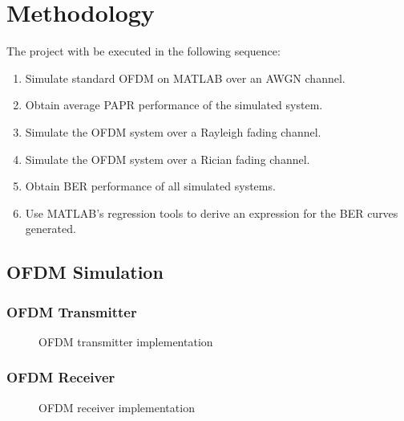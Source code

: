 
\chapter{Methodology}
The project with be executed in the following sequence:
\begin{enumerate}[label=\roman*.]
	\item Simulate standard \gls{OFDM} on MATLAB over an \gls{AWGN} channel.
	\item Obtain average \gls{PAPR} performance of the simulated system.
	\item Simulate the \gls{OFDM} system over a Rayleigh fading channel.
	\item Simulate the \gls{OFDM} system over a Rician fading channel.
	\item Obtain \gls{BER} performance of all simulated systems.
	\item Use MATLAB's regression tools to derive an expression for the \gls{BER} curves generated.
\end{enumerate}

\section{\gls{OFDM} Simulation}
\subsection{\gls{OFDM} Transmitter}
\begin{figure}[htpb!]
	\centerline{\resizebox{15cm}{!}{}}
	\caption{\gls{OFDM} transmitter implementation}
	\label{fig:ofdm_t_meth}
\end{figure}

\subsection{\gls{OFDM} Receiver}
\begin{figure}[htpb!]
	\centerline{\resizebox{15cm}{!}{}}
	\caption{\gls{OFDM} receiver implementation}
	\label{fig:ofdm_r_meth}
\end{figure}
